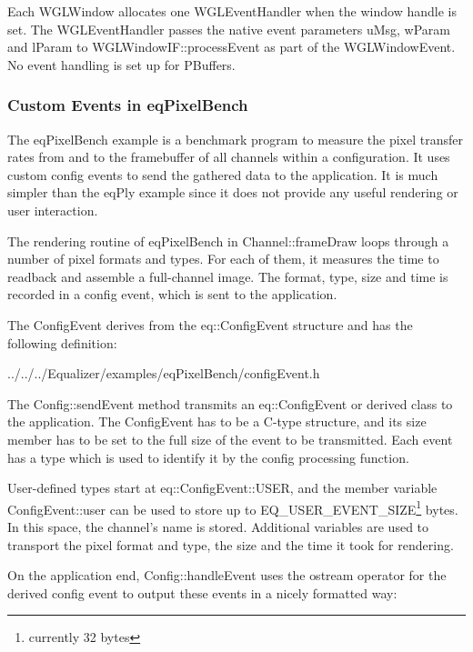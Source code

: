 \documentclass[10pt,a4]{scrartcl}
\begin{document}
Each \textsf{WGLWindow} allocates one \textsf{WGLEventHandler} when the
window handle is set. The WGLEventHandler passes the native event
parameters \textsf{uMsg}, \textsf{wParam} and \textsf{lParam} to
\textsf{WGL\-Win\-dowIF::processEvent} as part of the
\textsf{WGLWindowEvent}. No event handling is set up for PBuffers.

\subsubsection{Custom Events in eqPixelBench}

The \textsf{eqPixelBench} example is a benchmark program to measure the
pixel transfer rates from and to the framebuffer of all channels within
a configuration. It uses custom config events to send the gathered data
to the application. It is much simpler than the \textsf{eqPly} example
since it does not provide any useful rendering or user interaction.

The rendering routine of \textsf{eqPixelBench} in
\textsf{Channel::frameDraw} loops through a number of pixel formats and
types. For each of them, it measures the time to readback and assemble a
full-channel image. The format, type, size and time is recorded in a
config event, which is sent to the application.

The \textsf{ConfigEvent} derives from the \textsf{eq::ConfigEvent}
structure and has the following definition:

{\footnotesize
  {../../../Equalizer/examples/eqPixelBench/configEvent.h}}


The \textsf{Config::sendEvent} method transmits an
\textsf{eq::ConfigEvent} or derived class to the application. The
ConfigEvent has to be a C-type structure, and its \textsf{size}
member has to be set to the full size of the event to be transmitted.
Each event has a type which is used to identify it by the config 
processing function.

User-defined types start at \textsf{eq::ConfigEvent::USER}, and the
member variable \textsf{ConfigEvent::user} can be used to store up to
\textsf{EQ\_USER\_EVENT\_SIZE}\footnote{currently 32 bytes} bytes. In
this space, the channel's name is stored. Additional variables are used
to transport the pixel format and type, the size and the time it took
for rendering.

On the application end, \textsf{Config::handleEvent} uses the
\textsf{ostream} operator for the derived config event to output these
events in a nicely formatted way:
\end{document}
